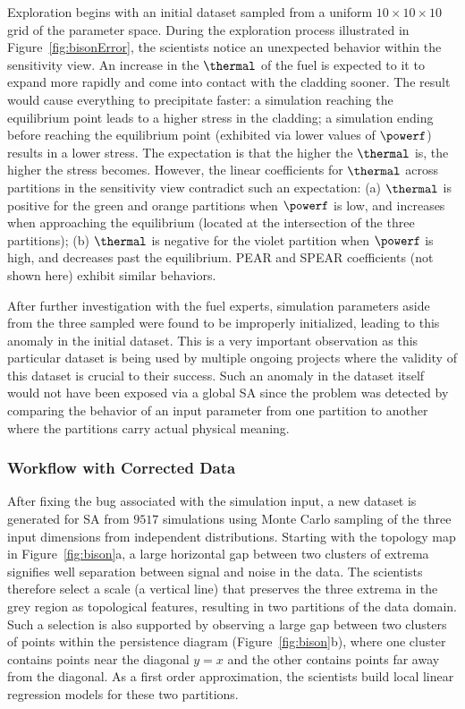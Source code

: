 Exploration begins with an initial dataset sampled from a
uniform $10\times10\times10$ grid of the parameter space.
%
During the exploration process illustrated in Figure~\ref{fig:bisonError}, the scientists notice an unexpected behavior within the sensitivity view.
%
An increase in the $\thermal$ of the fuel is expected to it
to expand more rapidly and come into contact with the cladding sooner.
%
The result would cause everything to precipitate faster:
a simulation reaching the equilibrium point leads to a higher stress in the cladding; a simulation ending before reaching the equilibrium point (exhibited via lower values of $\powerf$) results in a lower stress.
%
The expectation is that the higher the $\thermal$ is, the higher the stress becomes.
%
However, the linear coefficients for $\thermal$ across partitions in the sensitivity view contradict such an expectation:
(a) $\thermal$ is positive for the green and orange partitions when $\powerf$ is low, and increases when approaching the equilibrium (located at the intersection of the three partitions);
(b) $\thermal$ is negative for the violet partition when $\powerf$ is high, and decreases past the equilibrium.
PEAR and SPEAR coefficients (not shown here) exhibit similar behaviors.

After further investigation with the fuel experts, simulation parameters aside from the three sampled were found to be improperly initialized, leading to this anomaly in the initial dataset.
%
This is a very important observation as this particular dataset is being used by multiple ongoing projects where the validity of this dataset is crucial to their success.
%
Such an anomaly in the dataset itself would not have been exposed via a global SA since the problem was detected by comparing the behavior of an input parameter from one partition to another where the partitions carry actual physical meaning.

\subsubsection{Workflow with Corrected Data}
\label{sec:workflow}
After fixing the bug associated with the simulation input, a new dataset is generated for SA from $9517$ simulations using Monte Carlo sampling of the three input dimensions from independent distributions.
%
Starting with the topology map in Figure~\ref{fig:bison}a, a large horizontal gap between two clusters of extrema signifies well separation between signal and noise in the data.
%
The scientists therefore select a scale (a vertical line) that preserves the three extrema in the grey region as topological features, resulting in two partitions of the data domain.
%
Such a selection is also supported by observing a large gap between two clusters of points within the persistence diagram (Figure~\ref{fig:bison}b), where one cluster contains points near the diagonal $y=x$ and the other contains points far away from the diagonal.
%
As a first order approximation, the scientists build local linear regression models for these two partitions.

